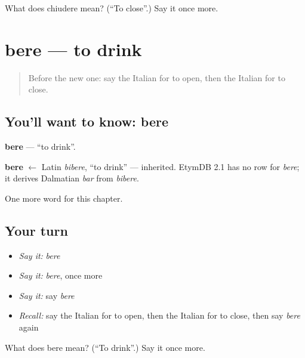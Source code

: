 \begin{tcolorbox}[breakable,colback=teal!4,colframe=teal!35!black,title={Before you move on}]
What does chiudere mean? (\textquotedblleft{}To close\textquotedblright{}.) Say it once more.
\end{tcolorbox}
\section[bere]{bere — to drink}

\label{lesson:IT-C50-bere}



\begin{quote}
Before the new one: say the Italian for to open, then the Italian for to close.
\end{quote}

\subsection*{You'll want to know: bere}
\textbf{bere} — \textquotedblleft{}to drink\textquotedblright{}.

\begin{cousinweb}
\textbf{bere} $\leftarrow$ Latin \emph{bibere}, \textquotedblleft{}to drink\textquotedblright{} — inherited. EtymDB 2.1 has no row for \emph{bere}; it derives Dalmatian \emph{bar} from \emph{bibere}.
\end{cousinweb}

\begin{grammarlens}[title={What you've built}]
One more word for this chapter.
\end{grammarlens}

\subsection*{Your turn}
\begin{itemize}
\raggedright
  \item \emph{Say it:} \emph{bere}
  \item \emph{Say it:} \emph{bere}, once more
  \item \emph{Say it:} say \emph{bere}
  \item \emph{Recall:} say the Italian for to open, then the Italian for to close, then say \emph{bere} again
\end{itemize}

\begin{tcolorbox}[breakable,colback=teal!4,colframe=teal!35!black,title={Before you move on}]
What does bere mean? (\textquotedblleft{}To drink\textquotedblright{}.) Say it once more.
\end{tcolorbox}
